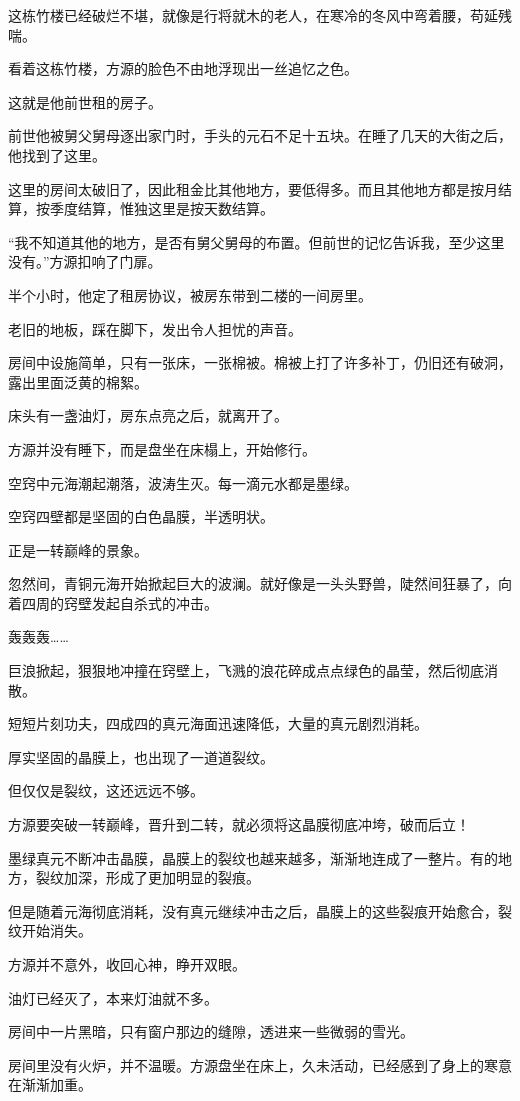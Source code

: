 \begin{this_body}
这栋竹楼已经破烂不堪，就像是行将就木的老人，在寒冷的冬风中弯着腰，苟延残喘。

看着这栋竹楼，方源的脸色不由地浮现出一丝追忆之色。

这就是他前世租的房子。

前世他被舅父舅母逐出家门时，手头的元石不足十五块。在睡了几天的大街之后，他找到了这里。

这里的房间太破旧了，因此租金比其他地方，要低得多。而且其他地方都是按月结算，按季度结算，惟独这里是按天数结算。

“我不知道其他的地方，是否有舅父舅母的布置。但前世的记忆告诉我，至少这里没有。”方源扣响了门扉。

半个小时，他定了租房协议，被房东带到二楼的一间房里。

老旧的地板，踩在脚下，发出令人担忧的声音。

房间中设施简单，只有一张床，一张棉被。棉被上打了许多补丁，仍旧还有破洞，露出里面泛黄的棉絮。

床头有一盏油灯，房东点亮之后，就离开了。

方源并没有睡下，而是盘坐在床榻上，开始修行。

空窍中元海潮起潮落，波涛生灭。每一滴元水都是墨绿。

空窍四壁都是坚固的白色晶膜，半透明状。

正是一转巅峰的景象。

忽然间，青铜元海开始掀起巨大的波澜。就好像是一头头野兽，陡然间狂暴了，向着四周的窍壁发起自杀式的冲击。

轰轰轰……

巨浪掀起，狠狠地冲撞在窍壁上，飞溅的浪花碎成点点绿色的晶莹，然后彻底消散。

短短片刻功夫，四成四的真元海面迅速降低，大量的真元剧烈消耗。

厚实坚固的晶膜上，也出现了一道道裂纹。

但仅仅是裂纹，这还远远不够。

方源要突破一转巅峰，晋升到二转，就必须将这晶膜彻底冲垮，破而后立！

墨绿真元不断冲击晶膜，晶膜上的裂纹也越来越多，渐渐地连成了一整片。有的地方，裂纹加深，形成了更加明显的裂痕。

但是随着元海彻底消耗，没有真元继续冲击之后，晶膜上的这些裂痕开始愈合，裂纹开始消失。

方源并不意外，收回心神，睁开双眼。

油灯已经灭了，本来灯油就不多。

房间中一片黑暗，只有窗户那边的缝隙，透进来一些微弱的雪光。

房间里没有火炉，并不温暖。方源盘坐在床上，久未活动，已经感到了身上的寒意在渐渐加重。


\end{this_body}
